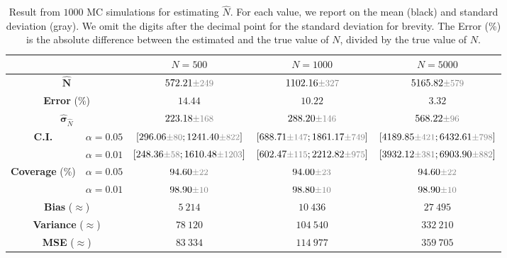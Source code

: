 \documentclass{article}
\newcommand{\variance}[1]{\ensuremath{\text{\small \textcolor{gray}{$\pm #1$}}}}
\begin{document}
\begin{table}[h]
    \centering 
    \caption*{$p_i \sim 0.02 \cdot \mathrm{Beta}(1, 3)$}
    \begin{tabular}{c c|c c c}
        \toprule
        & & \multicolumn{1}{|c|}{${N}=500$} & \multicolumn{1}{c|}{${N}=1000$} & \multicolumn{1}{c}{${N}=5000$} \\
        \midrule
        \multicolumn{2}{c|}{${\hat{\mathbf{N}}}$} & $572.21 \variance{249}$ & $1102.16 \variance{327}$ & $5165.82 \variance{579}$  \\
        \multicolumn{2}{c|}{\textbf{Error} (\%)} & $14.44$ & $10.22$ & $3.32$ \\
        \multicolumn{2}{c|}{${\hat{\mathbf{\sigma}}}_{\hat{N}}$} & $223.18 \variance{168}$ & $288.20 \variance{146}$ & $568.22 \variance{96}$\\
        \multirow{2}{*}{\textbf{C.I.}} & $\alpha = 0.05$ & $[296.06 \variance{80}; 1241.40 \variance{822}]$ & $[688.71 \variance{147}; 1861.17 \variance{749}]$ & $[4189.85 \variance{421}; 6432.61 \variance{798}]$
        \\
        & $\alpha = 0.01$ & $[248.36 \variance{58}; 1610.48 \variance{1203}]$ & $[602.47 \variance{115}; 2212.82 \variance{975}]$ & $[3932.12 \variance{381}; 6903.90 \variance{882}]$ \\
        \midrule
        \multirow{2}{*}{\textbf{Coverage} (\%)} & $\alpha = 0.05$ & $94.60 \variance{22}$ & $94.00 \variance{23}$ & $94.60 \variance{22}$ \\
        & $\alpha = 0.01$ & $98.90 \variance{10}$ & $98.80 \variance{10}$ & $98.90 \variance{10}$ \\
        \multicolumn{2}{c|}{\textbf{Bias} ($\approx$)} & $5\ 214$ & $10\ 436$ & $27\ 495$ \\
        \multicolumn{2}{c|}{\textbf{Variance} ($\approx$)} & $78\ 120$ & $104\ 540$ & $332\ 210$ \\
        \multicolumn{2}{c|}{\textbf{MSE} ($\approx$)} & $83\ 334$ & $114\ 977$ & $359\ 705$ \\
        \bottomrule
    \end{tabular}
    \caption{Result from $1000$ MC simulations for estimating $\hat{N}$. For each value, we report on the mean (black) and standard deviation (gray). We omit the digits after the decimal point for the standard deviation for brevity.
    The Error (\%) is the absolute difference between the estimated and the true value of $N$, divided by the true value of $N$.}
    \label{tab:problem_2_results_beta_1_3}
\end{table}
\end{document}
